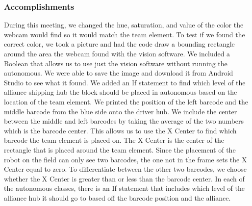 \subsubsection*{Accomplishments}
During this meeting, we changed the hue, saturation, and value of the color the webcam would find so it would match the team element. To test if we found the correct color, we took a picture and had the code draw a bounding rectangle around the area the webcam found with the vision software. We included a Boolean that allows us to use just the vision software without running the autonomous. We were able to save the image and download it from Android Studio to see what it found. We added an If statement to find which level of the alliance shipping hub the block should be placed in autonomous based on the location of the team element. We printed the position of the left barcode and the middle barcode from the blue side onto the driver hub. We include the center between the middle and left barcodes by taking the average of the two numbers which is the barcode center. This allows us to use the X Center to find which barcode the team element is placed on. The X Center is the center of the rectangle that is placed around the team element. Since the placement of the robot on the field can only see two barcodes, the one not in the frame sets the X Center equal to zero. To differentiate between the other two barcodes, we choose whether the X Center is greater than or less than the barcode center. In each of the autonomous classes, there is an If statement that includes which level of the alliance hub it should go to based off the barcode position and the alliance. 



